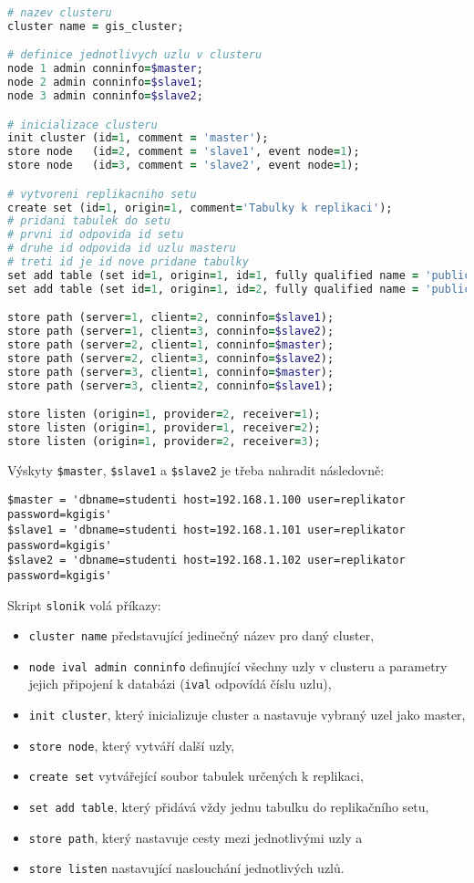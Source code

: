 \begin{lstlisting}[language=ruby]
# nazev clusteru
cluster name = gis_cluster;

# definice jednotlivych uzlu v clusteru
node 1 admin conninfo=$master;
node 2 admin conninfo=$slave1;
node 3 admin conninfo=$slave2;

# inicializace clusteru
init cluster (id=1, comment = 'master');
store node   (id=2, comment = 'slave1', event node=1);
store node   (id=3, comment = 'slave2', event node=1);

# vytvoreni replikacniho setu
create set (id=1, origin=1, comment='Tabulky k replikaci');
# pridani tabulek do setu
# prvni id odpovida id setu
# druhe id odpovida id uzlu masteru
# treti id je id nove pridane tabulky
set add table (set id=1, origin=1, id=1, fully qualified name = 'public.student', comment='seznam studentu');
set add table (set id=1, origin=1, id=2, fully qualified name = 'public.rodne_mesto', comment='seznam mest');

store path (server=1, client=2, conninfo=$slave1);
store path (server=1, client=3, conninfo=$slave2);
store path (server=2, client=1, conninfo=$master);
store path (server=2, client=3, conninfo=$slave2);
store path (server=3, client=1, conninfo=$master);
store path (server=3, client=2, conninfo=$slave1);

store listen (origin=1, provider=2, receiver=1);
store listen (origin=1, provider=1, receiver=2);
store listen (origin=1, provider=2, receiver=3);
\end{lstlisting}

Výskyty \texttt{\$master}, \texttt{\$slave1} a \texttt{\$slave2} je třeba nahradit
následovně:
\begin{lstlisting}
$master = 'dbname=studenti host=192.168.1.100 user=replikator password=kgigis'
$slave1 = 'dbname=studenti host=192.168.1.101 user=replikator password=kgigis'
$slave2 = 'dbname=studenti host=192.168.1.102 user=replikator password=kgigis'
\end{lstlisting}

Skript \texttt{slonik} volá příkazy:
\begin{itemize}
  \item \texttt{cluster name} představující jedinečný název pro daný cluster,
  \item \texttt{node ival admin conninfo} definující všechny uzly v clusteru a
    parametry jejich připojení k databázi (\texttt{ival} odpovídá číslu uzlu),
  \item \texttt{init cluster}, který inicializuje cluster a nastavuje vybraný
    uzel jako master,
  \item \texttt{store node}, který vytváří další uzly,
  \item \texttt{create set} vytvářející soubor tabulek určených k replikaci,
  \item \texttt{set add table}, který přidává vždy jednu tabulku do replikačního
    setu,
  \item \texttt{store path}, který nastavuje cesty mezi jednotlivými uzly a
  \item \texttt{store listen} nastavující naslouchání jednotlivých uzlů.
\end{itemize}

